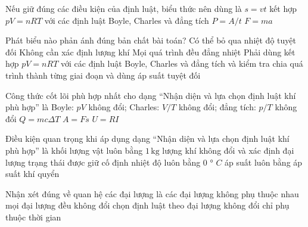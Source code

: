\begin{ex}
Nếu giữ đúng các điều kiện của định luật, biểu thức nên dùng là
\choice
{$s=vt$}
{\True kết hợp $pV=nRT$ với các định luật Boyle, Charles và đẳng tích}
{$P=A/t$}
{$F=ma$}
\end{ex}

\begin{ex}
Phát biểu nào phản ánh đúng bản chất bài toán?
\choice
{Có thể bỏ qua nhiệt độ tuyệt đối}
{Không cần xác định lượng khí}
{Mọi quá trình đều đẳng nhiệt}
{\True Phải dùng kết hợp $pV=nRT$ với các định luật Boyle, Charles và đẳng tích và kiểm tra chia quá trình thành từng giai đoạn và dùng áp suất tuyệt đối}
\end{ex}

\begin{ex}
Công thức cốt lõi phù hợp nhất cho dạng “Nhận diện và lựa chọn định luật khí phù hợp” là
\choice
{\True Boyle: $pV$ không đổi; Charles: $V/T$ không đổi; đẳng tích: $p/T$ không đổi}
{$Q=mc\Delta T$}
{$A=Fs$}
{$U=RI$}
\end{ex}

\begin{ex}
Điều kiện quan trọng khi áp dụng dạng “Nhận diện và lựa chọn định luật khí phù hợp” là
\choice
{khối lượng vật luôn bằng $1\,\text{kg}$}
{\True lượng khí không đổi và xác định đại lượng trạng thái được giữ cố định}
{nhiệt độ luôn bằng 0 ° $C$}
{áp suất luôn bằng áp suất khí quyển}
\end{ex}

\begin{ex}
Nhận xét đúng về quan hệ các đại lượng là
\choice
{các đại lượng không phụ thuộc nhau}
{mọi đại lượng đều không đổi}
{\True chọn định luật theo đại lượng không đổi}
{chỉ phụ thuộc thời gian}
\end{ex}

